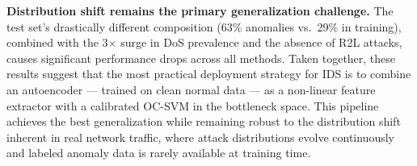 \textbf{Distribution shift remains the primary generalization challenge.}
The test set's drastically different composition (63\% anomalies vs.\ 29\% in training), combined with the 3$\times$ surge in DoS prevalence and the absence of R2L attacks, causes significant performance drops across all methods.
Taken together, these results suggest that the most practical deployment strategy for IDS is to combine an autoencoder --- trained on clean normal data --- as a non-linear feature extractor with a calibrated OC-SVM in the bottleneck space.
This pipeline achieves the best generalization while remaining robust to the distribution shift inherent in real network traffic, where attack distributions evolve continuously and labeled anomaly data is rarely available at training time.

